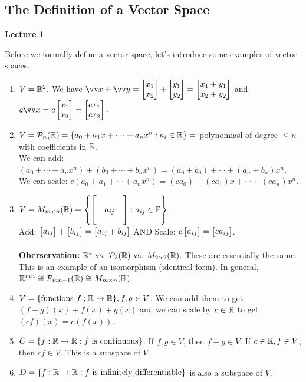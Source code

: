 \subsection{The Definition of a Vector Space}

{\large \textbf{Lecture 1}}

Before we formally define a vector space, let's introduce some examples of vector spaces.

\begin{example}
    \phantom{}
    \begin{enumerate}
        \item $V = {\mathbb{R}}^2.$ We have $\vx + \vy = \cv{x_1 \\ x_2} + \cv{y_1 \\ y_2} = \cv{x_1+y_1 \\ x_2+y_2}$ and $c\vx = c\cv{x_1 \\ x_2} = \cv{cx_1 \\ cx_2}.$
        \item $V =  \mathcal{P}_n({\mathbb{R}}) = \{ a_0 + a_1x + \cdots + a_nx^n : a_i \in {\mathbb{R}} \} =$ polynomiasl of degree $\leq n$ with coefficients in ${\mathbb{R}}$.  \\
        We can add: $(a_0 + \cdots + a_nx^n) + (b_0 + \cdots + b_nx^n) = (a_0 + b_0) + \cdots + (a_n + b_n)x^n.$    \\
        We can scale: $c(a_0 + a_1 + \cdots + a_nx^n) = (ca_0)+ (ca_1)x + \cdots + (ca_n)x^n$.
        \item $V = M_{m \times n}{({\mathbb{R}})} = \left\{
           \begin{bmatrix}
            &  & \\ 
            & a_{ij} & \\ 
            &  & 
           \end{bmatrix}: a_{ij} \in {\mathbb{F}}\right\}.$   \\
           Add: $\begin{bmatrix} a_{ij} \end{bmatrix} + \begin{bmatrix} b_{ij} \end{bmatrix} = \begin{bmatrix} a_{ij} + b_{ij} \end{bmatrix}$ \qquad AND \qquad Scale: $c\begin{bmatrix} a_{ij} \end{bmatrix} =  \begin{bmatrix} ca_{ij} \end{bmatrix}$. \\
           \phantom{}\\
           \textbf{Oberservation:} ${\mathbb{R}}^4 \text{ vs. } \mathcal{P}_3({\mathbb{R}}) \text{ vs. } M_{2 \times 2}{({\mathbb{R}})}.$ These are essentially the same. This is an example of an isomorphism (identical form).
           In general, ${\mathbb{R}}^{mn} \cong \mathcal{P}_{mn - 1}({\mathbb{R}}) \cong M_{m \times n}{({\mathbb{R}})}.$ 
        \item $V = \{\text{functions } f: {\mathbb{R}} \to {\mathbb{R}}\}, f,g \in V$. We can add them to get $(f + g)(x) + f(x) + g(x)$ and we can scale by $c \in {\mathbb{R}}$
              to get $(cf)(x) = c(f(x)).$
        \item $C = \left\{f: {\mathbb{R}} \to {\mathbb{R}}: f \text{ is continuous}\right\}$. If $f, g \in V$, then $f + g \in V.$ If $c \in {\mathbb{R}}, f \in V$, then $cf \in V$. This is a subspace of $V$.
        \item $D = \left\{  f: {\mathbb{R}} \to {\mathbb{R}}: f \text{ is infinitely differentiable} \right\}$ is also a subspace of $V$.
    \end{enumerate} 
\end{example}

